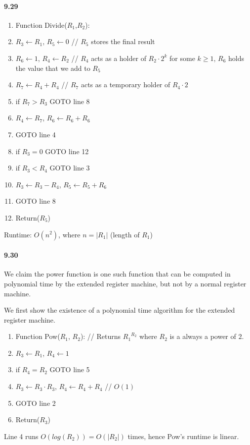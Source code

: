 \documentclass{article}
\begin{document}
\paragraph{9.29}
\begin{enumerate}
	\item Function Divide($R_1$,$R_2$):
	\item $R_3\gets R_1$, $R_5\gets 0$ // $R_5$ stores the final result
	\item $R_6\gets 1$, $R_4\gets R_2$ // $R_4$ acts as a holder of $R_2\cdot 2^k$ for some $k\geq 1$, $R_6$ holds the value that we add to $R_5$
	\item $R_7\gets R_4 + R_4$ // $R_7$ acts as a temporary holder of $R_4\cdot 2$
	\item if $R_7 > R_3$ GOTO line 8
	\item $R_4\gets R_7$, $R_6\gets R_6 + R_6$
	\item GOTO line 4
	\item if $R_3=0$ GOTO line 12
	\item if $R_3 < R_4$ GOTO line 3
	\item $R_3\gets R_3 - R_4$, $R_5\gets R_5 + R_6$
	\item GOTO line 8
	\item Return($R_5$)
\end{enumerate}
Runtime: $O(n^2)$, where $n=|R_1|$ (length of $R_1$)


\paragraph{9.30} We claim the power function is one such function that can be computed in polynomial time by the extended register machine, but not by a normal register machine.

We first show the existence of a polynomial time algorithm for the extended register machine.

\begin{enumerate}
	\item Function Pow($R_1$, $R_2$): // Returns ${R_1}^{R_2}$ where $R_2$ is a always a power of $2$.
	\item $R_3\gets R_1$, $R_4\gets 1$	
	\item if $R_4=R_2$ GOTO line 5
	\item $R_3\gets R_3 \cdot R_3$, $R_4\gets R_4 + R_4$ // $O(1)$
	\item GOTO line 2
	\item Return($R_3$)
\end{enumerate}
Line 4 runs $O(log(R_2)) = O(|R_2|)$ times, hence Pow's runtime is linear.
\end{document}
